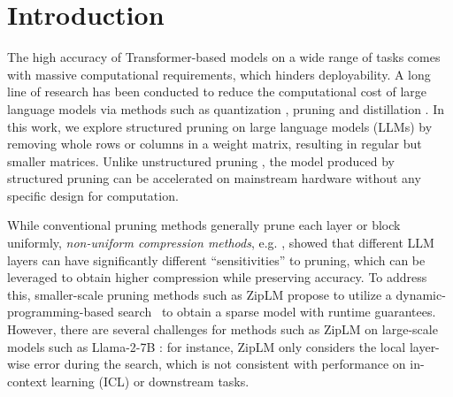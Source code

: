 ﻿\vspace{-2em}
\section{Introduction}
The high accuracy of Transformer-based models on a wide range of tasks comes with massive computational requirements, which hinders deployability. A long line of research has been conducted to reduce the computational cost of large language models via methods such as quantization \citep{frantar2022gptq, dettmers2023spqr}, pruning \citep{xia2023sheared, frantar2023sparsegpt} and distillation \cite{hsieh2023distilling}. In this work, we explore structured pruning on large language models (LLMs) by removing whole rows or columns in a weight matrix, resulting in regular but smaller matrices. Unlike unstructured pruning \citep{frantar2023sparsegpt}, the model produced by structured pruning can be accelerated on mainstream hardware without any specific design for computation. 

While conventional pruning methods generally prune each layer or block uniformly, \emph{non-uniform compression methods}, e.g. \citep{yin2023outlier, sieberling2024evopress}, showed that different LLM layers can have significantly different ``sensitivities'' to pruning, which can be leveraged to obtain higher compression while preserving accuracy. 
To address this, smaller-scale pruning methods such as ZipLM \citep{kurtic2023ziplm} propose to utilize a dynamic-programming-based search~\citep{frantar2022spdy} to obtain a sparse model with runtime guarantees. However, there are several challenges for methods such as ZipLM on large-scale models such as Llama-2-7B \citep{touvron2023llama}: for instance, ZipLM only considers the local layer-wise error during the search, which is not consistent with performance on in-context learning (ICL) or downstream tasks. 

